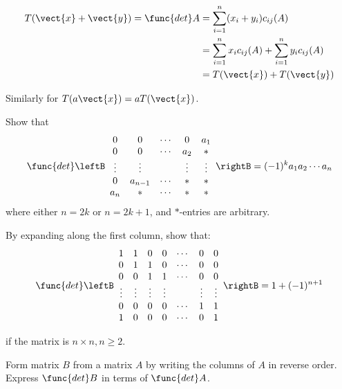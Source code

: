 \begin{multicols}{2}
\begin{ex}
\begin{sol}
\begin{align*}
T(\vect{x} + \vect{y}) = \func{det } A &= \sum_{i=1}^{n} (x_i + y_i)c_{ij}(A) \\
&= \sum_{i=1}^{n} x_ic_{ij}(A) + \sum_{i=1}^{n} y_ic_{ij}(A)\\
&= T(\vect{x}) + T(\vect{y})
\end{align*}

Similarly for $T(a\vect{x}) = aT(\vect{x})$.
\end{sol}
\end{ex}


\begin{ex}
Show that
\begin{equation*}
\func{det} \leftB \begin{array}{ccccc}
0 & 0 & \cdots & 0 & a_1 \\
0 & 0 & \cdots & a_2 & * \\
\vdots & \vdots & & \vdots & \vdots \\
0 & a_{n-1} & \cdots & * & * \\
a_n & * & \cdots & * & *
\end{array}
\rightB
= 
(-1)^k a_1a_2 \cdots a_n
\end{equation*}
where either $n = 2k$ or $n = 2k + 1$, and $*$-entries are arbitrary.
\end{ex}

\begin{ex}
By expanding along the first column, show that:
\begin{equation*}
\func{det} \leftB \begin{array}{ccccccc}
1 & 1 & 0 & 0 & \cdots & 0 & 0 \\
0 & 1 & 1 & 0 & \cdots & 0 & 0 \\
0 & 0 & 1 & 1 & \cdots & 0 & 0 \\
\vdots & \vdots & \vdots & \vdots & & \vdots & \vdots \\
0 & 0 & 0 & 0 & \cdots & 1 & 1 \\
1 & 0 & 0 & 0 & \cdots & 0 & 1 \\
\end{array}
\rightB
= 1 + (-1)^{n+1}
 \end{equation*}

if the matrix is $n \times n, n \geq 2$.
\end{ex}

\begin{ex}
Form matrix $B$ from a matrix $A$ by writing the columns of $A$ in reverse order. Express $\func{det } B$ in terms of $\func{det } A$.


\end{ex}
\end{multicols}
